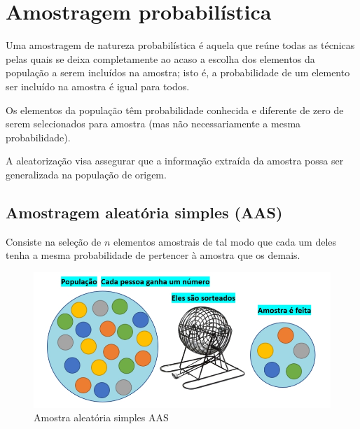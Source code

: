 \documentclass[
]{book}
\begin{document}
\hfill\break

\hypertarget{amostragem-probabiluxedstica}{%
\section{Amostragem probabilística}\label{amostragem-probabiluxedstica}}

\hfill\break

Uma amostragem de natureza probabilística é aquela que reúne todas as técnicas pelas quais se deixa completamente ao acaso a escolha dos elementos da população a serem incluídos na amostra; isto é, a probabilidade de um elemento ser incluído na amostra é igual para todos.

\hfill\break

Os elementos da população têm probabilidade conhecida e diferente de zero de serem selecionados para amostra (mas não necessariamente a mesma probabilidade).

\hfill\break

A aleatorização visa assegurar que a informação extraída da amostra possa ser generalizada na população de origem.

\hypertarget{amostragem-aleatuxf3ria-simples-aas}{%
\subsection{Amostragem aleatória simples (AAS)}\label{amostragem-aleatuxf3ria-simples-aas}}

\hfill\break

Consiste na seleção de \(n\) elementos amostrais de tal modo que cada um deles tenha a mesma probabilidade de pertencer à amostra que os demais.

\hfill\break

\begin{figure}

{\centering \includegraphics[width=0.8\linewidth]{images7/aas} 

}

\caption{Amostra aleatória simples AAS}\label{fig:fig36}
\end{figure}
\end{document}
